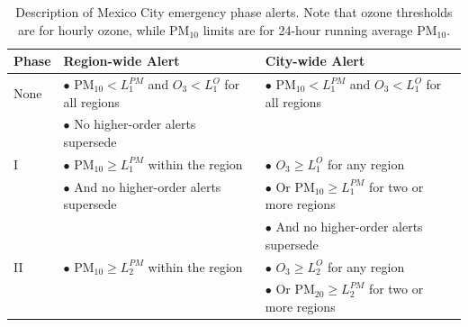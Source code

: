 \documentclass[alpha-refs]{wiley-article}
\begin{document}
%

\begin{table}[H]
\centering
\footnotesize
\begin{tabular}{| l | l | l |}
  \hline
 Phase & Region-wide Alert & City-wide Alert \\
  \hline
 \rule{0pt}{2.5ex}None & $\bullet$ $\text{PM}_{10} < L_{1}^{PM}$ and $O_3 < L_{1}^{O}$ for all regions & $\bullet$ $\text{PM}_{10} < L_{1}^{PM}$ and $O_3 < L_{1}^{O}$ for all regions \\
   & $\bullet$ No higher-order alerts supersede &  \\
   \hline
 \rule{0pt}{2.5ex}I & $\bullet$ $\text{PM}_{10} \geq L_{1}^{PM}$ within the region &  $\bullet$ $ O_3 \geq L_{1}^{O}$ for any region \\
      & $\bullet$ And no higher-order alerts supersede  & $\bullet$ Or $\text{PM}_{10} \geq L_{1}^{PM}$ for two or more regions \\
    & & $\bullet$ And no higher-order alerts supersede \\
    \hline
 \rule{0pt}{2.5ex}II & $\bullet$ $\text{PM}_{10} \geq L_{2}^{PM}$ within the region &  $\bullet$ $ O_3 \geq L_{2}^{O}$ for any region \\
     & & $\bullet$ Or $\text{PM}_{20} \geq L_{2}^{PM}$ for two or more regions \\
   \hline
\end{tabular}
\caption{Description of Mexico City emergency phase alerts. Note that ozone thresholds are for hourly ozone, while $\text{PM}_{10}$ limits are for 24-hour running average $\text{PM}_{10}$. }\label{tab:phase}
\end{table}
\end{document}
